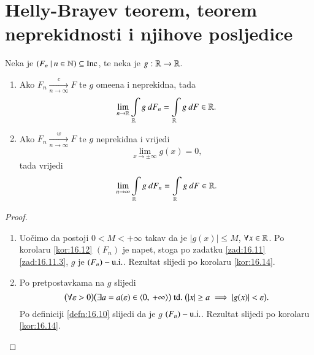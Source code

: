 
\chapter{Helly-Brayev teorem, teorem neprekidnosti i njihove posljedice}

\begin{tm}  \label{tm:18.1}
    Neka je $({F_n} \: | \: {n \in \mathbb{N}}) \subseteq \mathrm{Inc}$, te neka je $g: \mathbb{R} \to \mathbb{R}$.
    \begin{enumerate}[label=(\roman*)]
        \item   \label{tm:18.1.1}
        Ako $F_n \xrightarrow[n \to \infty]{c} F$ te $g$ ome\dj ena i neprekidna, tada
        \begin{equation*}
            \lim\limits_{n \to \mathbb{R}} \int\limits_{\mathbb{R}} g \: d F_n = \int\limits_{\mathbb{R}} g \: d F \in \mathbb{R}.
        \end{equation*}
        \item   \label{tm:18.1.2}
        Ako $F_n \xrightarrow[n \to \infty]{w} F$ te $g$ neprekidna i vrijedi
        \begin{equation*}
            \lim\limits_{x \to \pm \infty} g (x) = 0,    
        \end{equation*}
        tada vrijedi
        \begin{equation*}
            \lim\limits_{n \to \infty} \int\limits_{\mathbb{R}} g \: d F_n = \int\limits_{\mathbb{R}} g \: d F \in \mathbb{R}.
        \end{equation*}
    \end{enumerate}
\end{tm}

\begin{proof}
    \begin{enumerate}[label=(\roman*)]
        \item
        Uo\v cimo da postoji $0<M<+\infty$ takav da je $|g(x)| \leq M$, $\forall x \in \mathbb{R}$.
        Po korolaru \ref{kor:16.12} $(F_n)$ je napet, stoga po zadatku \ref{zad:16.11} \ref{zad:16.11.3}, $g$ je $(F_n)-\mathrm{u.i.}$.
        Rezultat slijedi po korolaru \ref{kor:16.14}.
        \item
        Po pretpostavkama na $g$ slijedi
        \begin{equation*}
            \big(\forall \varepsilon > 0\big) \big(\exists a = a (\varepsilon) \in \langle {0}, \: {+\infty} \rangle\big) \; \mathrm{td.} \; \big(|x| \geq a \implies |g(x)| < \varepsilon \big).
        \end{equation*}
        Po definiciji \ref{defn:16.10} slijedi da je $g$ $(F_n)-\mathrm{u.i.}$.
        Rezultat slijedi po korolaru \ref{kor:16.14}.
    \end{enumerate}
\end{proof}

